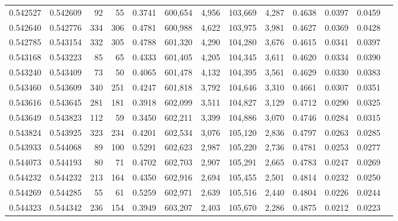 \begin{tabular}{rrrrrrrrrrrrr}
0.542527 & 0.542609 &    92 &    55 &                                     0.3741 & 600,654 &   4,956 & 103,669 &   4,287 & 0.4638 & 0.0397 & 0.0459 \\
0.542640 & 0.542776 &   334 &   306 &                                     0.4781 & 600,988 &   4,622 & 103,975 &   3,981 & 0.4627 & 0.0369 & 0.0428 \\
0.542785 & 0.543154 &   332 &   305 &                                     0.4788 & 601,320 &   4,290 & 104,280 &   3,676 & 0.4615 & 0.0341 & 0.0397 \\
0.543168 & 0.543223 &    85 &    65 &                                     0.4333 & 601,405 &   4,205 & 104,345 &   3,611 & 0.4620 & 0.0334 & 0.0390 \\
0.543240 & 0.543409 &    73 &    50 &                                     0.4065 & 601,478 &   4,132 & 104,395 &   3,561 & 0.4629 & 0.0330 & 0.0383 \\
0.543460 & 0.543609 &   340 &   251 &                                     0.4247 & 601,818 &   3,792 & 104,646 &   3,310 & 0.4661 & 0.0307 & 0.0351 \\
0.543616 & 0.543645 &   281 &   181 &                                     0.3918 & 602,099 &   3,511 & 104,827 &   3,129 & 0.4712 & 0.0290 & 0.0325 \\
0.543649 & 0.543823 &   112 &    59 &                                     0.3450 & 602,211 &   3,399 & 104,886 &   3,070 & 0.4746 & 0.0284 & 0.0315 \\
0.543824 & 0.543925 &   323 &   234 &                                     0.4201 & 602,534 &   3,076 & 105,120 &   2,836 & 0.4797 & 0.0263 & 0.0285 \\
0.543933 & 0.544068 &    89 &   100 &                                     0.5291 & 602,623 &   2,987 & 105,220 &   2,736 & 0.4781 & 0.0253 & 0.0277 \\
0.544073 & 0.544193 &    80 &    71 &                                     0.4702 & 602,703 &   2,907 & 105,291 &   2,665 & 0.4783 & 0.0247 & 0.0269 \\
0.544232 & 0.544232 &   213 &   164 &                                     0.4350 & 602,916 &   2,694 & 105,455 &   2,501 & 0.4814 & 0.0232 & 0.0250 \\
0.544269 & 0.544285 &    55 &    61 &                                     0.5259 & 602,971 &   2,639 & 105,516 &   2,440 & 0.4804 & 0.0226 & 0.0244 \\
0.544323 & 0.544342 &   236 &   154 &                                     0.3949 & 603,207 &   2,403 & 105,670 &   2,286 & 0.4875 & 0.0212 & 0.0223 \\

\end{tabular}
